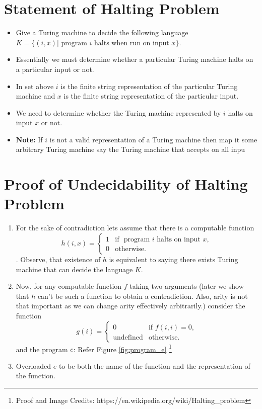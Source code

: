 \documentclass[
11pt,notheorems,hyperref={pdfauthor=whatever}
]{beamer}
\begin{document}

\section{Statement of Halting Problem}
\begin{frame}
\begin{itemize}
    \item Give a Turing machine to decide the following language $K = \{(i, x) | \text{ program } i \text{ halts when run on input } x\}$.
    \item Essentially we must determine whether a particular Turing machine halts on a particular input or not.
    \item In set above $i$ is the finite string representation of the particular Turing machine and $x$ is the finite string representation of the particular input.
    \item We need to determine whether the Turing machine represented by $i$ halts on input $x$ or not.
    \item \textbf{Note: } If $i$ is not a valid representation of a Turing machine then map it some arbitrary Turing machine say the Turing machine that accepts on all inpu
\end{itemize}
\end{frame}

\section{Proof of Undecidability of Halting Problem}
\begin{frame}
\begin{enumerate}
    \item For the sake of contradiction lets assume that there is a computable function $$h(i, x) = \begin{cases}
  1 & \text{if } \text{  program }i\text{ halts on input }x, \\
  0 & \text{otherwise.}
\end{cases}$$. Observe, that existence of $h$ is equivalent to saying there exists Turing machine that can decide the language $K$.
    \item Now, for any computable function $f$ taking two arguments (later we show that $h$ can't be such a function to obtain a contradiction. Also, arity is not that important as we can change arity effectively arbitrarily.) consider the function $$g(i) = \begin{cases}
  0  & \text{if } f(i,i) = 0,\\
  \text{undefined} & \text{otherwise.}
\end{cases}$$ and the program $e$: Refer Figure \ref{fig:program_e} \footnote{Proof and Image Credits: https://en.wikipedia.org/wiki/Halting\_problem}
    \item Overloaded $e$ to be both the name of the function and the representation of the function.
\end{enumerate}
\end{frame}
\end{document}
